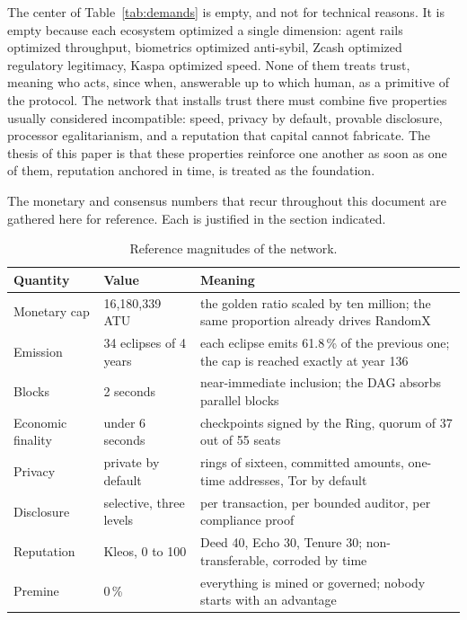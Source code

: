 The center of Table~\ref{tab:demands} is empty, and not for technical
reasons. It is empty because each ecosystem optimized a single dimension:
agent rails optimized throughput, biometrics optimized anti-sybil, Zcash
optimized regulatory legitimacy, Kaspa optimized speed. None of them treats
trust, meaning who acts, since when, answerable up to which human, as a
primitive of the protocol. The network that installs trust there must
combine five properties usually considered incompatible: speed, privacy by
default, provable disclosure, processor egalitarianism, and a reputation
that capital cannot fabricate. The thesis of this paper is that these
properties reinforce one another as soon as one of them, reputation
anchored in time, is treated as the foundation.

The monetary and consensus numbers that recur throughout this document are
gathered here for reference. Each is justified in the section indicated.

\begin{table}[htbp]
\centering
\small
\caption{Reference magnitudes of the network.}
\label{tab:magnitudes}
\begin{tabularx}{\textwidth}{@{}L{3.6cm}L{4.4cm}Y@{}}
\toprule
Quantity & Value & Meaning \\
\midrule
Monetary cap & 16,180,339 ATU & the golden ratio scaled by ten million; the same proportion already drives RandomX \\
Emission & 34 eclipses of 4 years & each eclipse emits 61.8\,\% of the previous one; the cap is reached exactly at year 136 \\
Blocks & 2 seconds & near-immediate inclusion; the DAG absorbs parallel blocks \\
Economic finality & under 6 seconds & checkpoints signed by the Ring, quorum of 37 out of 55 seats \\
Privacy & private by default & rings of sixteen, committed amounts, one-time addresses, Tor by default \\
Disclosure & selective, three levels & per transaction, per bounded auditor, per compliance proof \\
Reputation & Kleos, 0 to 100 & Deed 40, Echo 30, Tenure 30; non-transferable, corroded by time \\
Premine & 0\,\% & everything is mined or governed; nobody starts with an advantage \\
\bottomrule
\end{tabularx}
\end{table}

